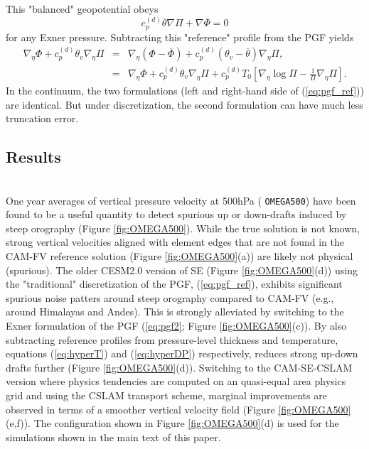 \documentclass[draft]{agujournal2019}
\begin{document}
This "balanced" geopotential obeys
\begin{equation}
    c_p^{(d)}\overline{\theta}\nabla \Pi+\nabla \overline{\Phi}=0 
\end{equation}
for any Exner pressure. Subtracting this "reference" profile from the PGF yields
\begin{eqnarray}
    \nabla_{\eta }\Phi+c_p^{(d)}\theta_v\nabla_{\eta }\Pi&=& \nabla_{\eta }\left(\Phi-\overline{\Phi}\right)+c_p^{(d)}\left(\theta_v-\overline{\theta}\right)\nabla_{\eta }\Pi,\nonumber \\
    &=& \nabla_{\eta }\Phi+c_p^{(d)}\theta_v\nabla_{\eta }\Pi+c_p^{(d)}T_0\left[ \nabla_\eta \log \Pi -\frac{1}{\Pi}\nabla_\eta \Pi\right].\label{eq:pgf_ref}
\end{eqnarray}
In the continuum, the two formulations (left and right-hand side of (\ref{eq:pgf_ref})) are identical. But under discretization, the second formulation can have much less truncation error. 

\subsection{Results}
{\color{red}{[Adam: have you defined ne30np4 in the main text?]}}\\
One year averages of vertical pressure velocity at 500hPa ( {\tt OMEGA500}) have been found to be a useful quantity to detect spurious up or down-drafts induced by steep orography (Figure \ref{fig:OMEGA500}). While the true solution is not known, strong vertical velocities aligned with element edges that are not found in the CAM-FV reference solution (Figure \ref{fig:OMEGA500}(a)) are likely not physical (spurious). The older CESM2.0 version of SE (Figure \ref{fig:OMEGA500}(d)) using the "traditional" discretization of the PGF, (\ref{eq:pgf_ref}), exhibits significant spurious noise patters around steep orography compared to CAM-FV (e.g., around Himalayas and Andes). This is strongly alleviated by switching to the Exner formulation of the PGF (\ref{eq:pgf2}; Figure \ref{fig:OMEGA500}(c)). By also subtracting reference profiles from pressure-level thickness and temperature, equations (\ref{eq:hyperT}) and (\ref{eq:hyperDP}) respectively, reduces strong up-down drafts further (Figure \ref{fig:OMEGA500}(d)). Switching to the CAM-SE-CSLAM version where physics tendencies are computed on an quasi-equal area physics grid and using the CSLAM transport scheme, marginal improvements are observed in terms of a smoother vertical velocity field (Figure \ref{fig:OMEGA500}(e,f)). The configuration shown in Figure \ref{fig:OMEGA500}(d) is used for the simulations shown in the main text of this paper.
\end{document}
